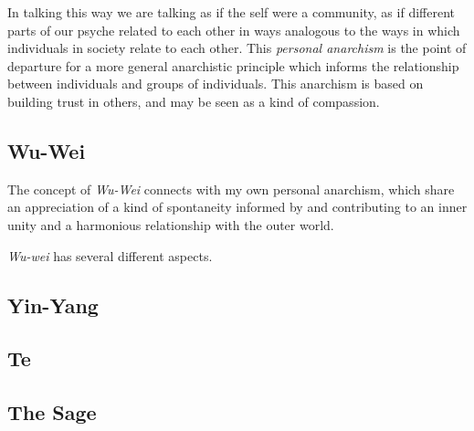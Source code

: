 \documentclass[numreferences]{rbjk}
\begin{document}
\begin{article}
In talking this way we are talking as if the self were a community, as if different parts of our psyche related to each other in ways analogous to the ways in which individuals in society relate to each other.
This {\it personal anarchism} is the point of departure for a more general anarchistic principle which informs the relationship between individuals and groups of individuals.
This anarchism is based on building trust in others, and may be seen as a kind of compassion.



\subsection{Wu-Wei}

The concept of {\it Wu-Wei} connects with my own personal anarchism, which share an appreciation of a kind of spontaneity informed by and contributing to an inner unity and a harmonious relationship with the outer world.

{\it Wu-wei} has several different aspects.



\subsection{Yin-Yang}

\subsection{Te} 

\subsection{The Sage}



%
%


\end{article}
\end{document}
